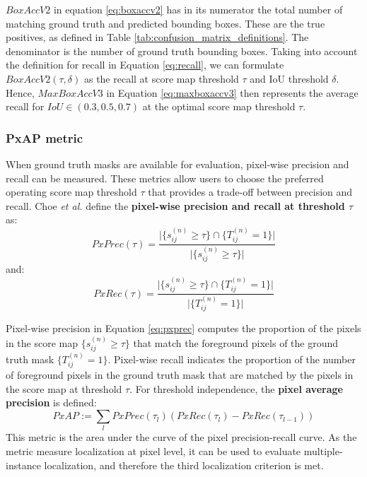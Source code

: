$BoxAccV2$ in equation \ref{eq:boxaccv2} has in its numerator the total number of matching ground truth and predicted bounding boxes. These are the true positives, as defined in Table \ref{tab:confusion_matrix_definitions}. The denominator is the number of ground truth bounding boxes. Taking into account the definition for recall in Equation \ref{eq:recall}, we can formulate $BoxAccV2(\tau, \delta)$ as the recall at score map threshold $\tau$ and IoU threshold $\delta$. Hence, $MaxBoxAccV3$ in Equation \ref{eq:maxboxaccv3} then represents the average recall for $IoU \in (0.3, 0.5, 0.7)$ at the optimal score map threshold $\tau$.

\subsubsection{PxAP metric}
When ground truth masks are available for evaluation, pixel-wise precision and recall can be measured. These metrics allow users to choose the preferred operating score map threshold $\tau$ that provides a trade-off between precision and recall. Choe \textit{et al.} define the \textbf{pixel-wise precision and recall at threshold $\tau$} as:
\begin{equation} \label{eq:pxprec}
    PxPrec(\tau) = \frac{\lvert \{ s^{(n)}_{ij} \ge \tau \} \cap \{ T^{(n)}_{ij} = 1 \} \rvert}{\lvert \{ s^{(n)}_{ij} \ge \tau \} \rvert}
\end{equation}
and:
\begin{equation} \label{eq:pxrec}
    PxRec(\tau) = \frac{\lvert \{ s^{(n)}_{ij} \ge \tau \} \cap \{ T^{(n)}_{ij} = 1 \} \rvert}{\lvert \{ T^{(n)}_{ij} = 1 \} \rvert}
\end{equation}

Pixel-wise precision in Equation \ref{eq:pxprec} computes the proportion of the pixels in the score map $\{ s^{(n)}_{ij} \ge \tau \}$ that match the foreground pixels of the ground truth mask $\{ T^{(n)}_{ij} = 1 \}$. Pixel-wise recall indicates the proportion of the number of foreground pixels in the ground truth mask that are matched by the pixels in the score map at threshold $\tau$. For threshold independence, the \textbf{pixel average precision} is defined:
\begin{equation}
    PxAP := \sum_{l} PxPrec(\tau_{l})(PxRec(\tau_{l}) - PxRec(\tau_{l-1}))
\end{equation}
This metric is the area under the curve of the pixel precision-recall curve. As the metric measure localization at pixel level, it can be used to evaluate multiple-instance localization, and therefore the third localization criterion is met.

